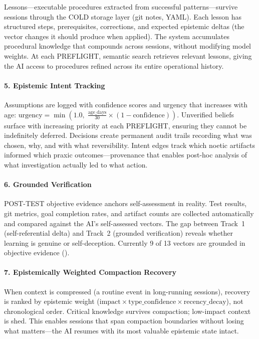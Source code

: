 Lessons---executable procedures extracted from successful patterns---survive sessions through the COLD storage layer (git notes, YAML). Each lesson has structured steps, prerequisites, corrections, and expected epistemic deltas (the vector changes it should produce when applied). The system accumulates procedural knowledge that compounds across sessions, without modifying model weights. At each PREFLIGHT, semantic search retrieves relevant lessons, giving the AI access to procedures refined across its entire operational history.

\paragraph{5. Epistemic Intent Tracking}

Assumptions are logged with confidence scores and urgency that increases with age: $\text{urgency} = \min(1.0,\; \frac{\text{age\_days}}{30} \times (1 - \text{confidence}))$. Unverified beliefs surface with increasing priority at each PREFLIGHT, ensuring they cannot be indefinitely deferred. Decisions create permanent audit trails recording what was chosen, why, and with what reversibility. Intent edges track which noetic artifacts informed which praxic outcomes---provenance that enables post-hoc analysis of what investigation actually led to what action.

\paragraph{6. Grounded Verification}

POST-TEST objective evidence anchors self-assessment in reality. Test results, git metrics, goal completion rates, and artifact counts are collected automatically and compared against the AI's self-assessed vectors. The gap between Track~1 (self-referential delta) and Track~2 (grounded verification) reveals whether learning is genuine or self-deception. Currently 9 of 13 vectors are grounded in objective evidence ().

\paragraph{7. Epistemically Weighted Compaction Recovery}

When context is compressed (a routine event in long-running sessions), recovery is ranked by epistemic weight ($\text{impact} \times \text{type\_confidence} \times \text{recency\_decay}$), not chronological order. Critical knowledge survives compaction; low-impact context is shed. This enables sessions that span compaction boundaries without losing what matters---the AI resumes with its most valuable epistemic state intact.

